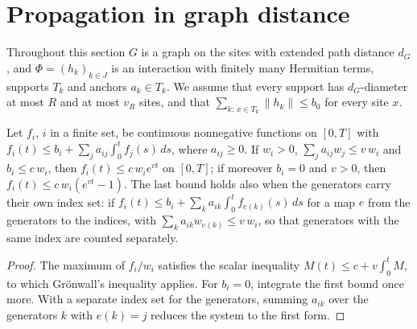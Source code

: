 \section{Propagation in graph distance}
\label{sec:dynamics_graph}

Throughout this section $G$ is a graph on the sites with extended path
distance $d_G$, and $\Phi=(h_k)_{k\in J}$ is an interaction with finitely many
Hermitian terms, supports $T_k$ and anchors $a_k\in T_k$. We assume that every
support has $d_G$-diameter at most $R$ and at most $v_R$ sites, and that
$\sum_{k:\,x\in T_k}\lVert h_k\rVert\leq b_0$ for every site $x$.

\begin{lemma}
    \label{lem:dynamics_volterra}
    \leanok
    Let $f_i$, $i$ in a finite set, be continuous nonnegative functions on
    $[0,T]$ with $f_i(t)\leq b_i+\sum_ja_{ij}\int_0^tf_j(s)\,ds$, where
    $a_{ij}\geq0$. If $w_i>0$, $\sum_ja_{ij}w_j\leq v\,w_i$ and $b_i\leq c\,w_i$,
    then $f_i(t)\leq c\,w_ie^{vt}$ on $[0,T]$; if moreover $b_i=0$ and $v>0$,
    then $f_i(t)\leq c\,w_i(e^{vt}-1)$. The last bound holds also when the
    generators carry their own index set: if
    $f_i(t)\leq b_i+\sum_{k}a_{ik}\int_0^tf_{e(k)}(s)\,ds$ for a map $e$ from
    the generators to the indices, with $\sum_ka_{ik}w_{e(k)}\leq v\,w_i$, so
    that generators with the same index are counted separately.
\end{lemma}
\begin{proof}\leanok
    The maximum of $f_i/w_i$ satisfies the scalar inequality
    $M(t)\leq c+v\int_0^tM$, to which Gr\"onwall's inequality applies. For
    $b_i=0$, integrate the first bound once more. With a separate index set for
    the generators, summing $a_{ik}$ over the generators $k$ with $e(k)=j$
    reduces the system to the first form.
\end{proof}

